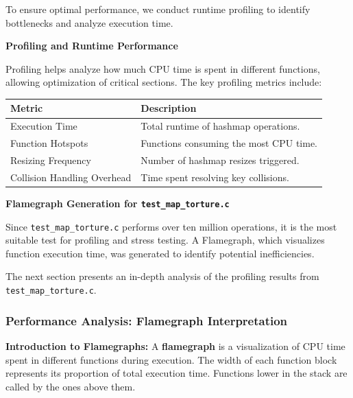 \documentclass[titlepage]{article}
\begin{document}
To ensure optimal performance, we conduct runtime profiling to identify bottlenecks and analyze execution time.

\vspace{5mm}

\textbf{Profiling and Runtime Performance}

Profiling helps analyze how much CPU time is spent in different functions, allowing optimization of critical sections. The key profiling metrics include:

\begin{center}
\renewcommand{\arraystretch}{1.3}
\begin{tabular}{@{} l l @{} }
    \toprule
    \textbf{Metric} & \textbf{Description} \\
    \midrule
    Execution Time & Total runtime of hashmap operations. \\
    Function Hotspots & Functions consuming the most CPU time. \\
    Resizing Frequency & Number of hashmap resizes triggered. \\
    Collision Handling Overhead & Time spent resolving key collisions. \\
    \bottomrule
\end{tabular}
\end{center}

\vspace{5mm}

\textbf{Flamegraph Generation for \texttt{test\_map\_torture.c}}

Since \texttt{test\_map\_torture.c} performs over ten million operations, it is the most suitable test for profiling and stress testing. A Flamegraph, which visualizes function execution time, was generated to identify potential inefficiencies.

The next section presents an in-depth analysis of the profiling results from \texttt{test\_map\_torture.c}.

\subsubsection{Performance Analysis: Flamegraph Interpretation}

\textbf{Introduction to Flamegraphs:}
A \textbf{flamegraph} is a visualization of CPU time spent in different functions during execution. The width of each function block represents its proportion of total execution time. Functions lower in the stack are called by the ones above them.
\end{document}
